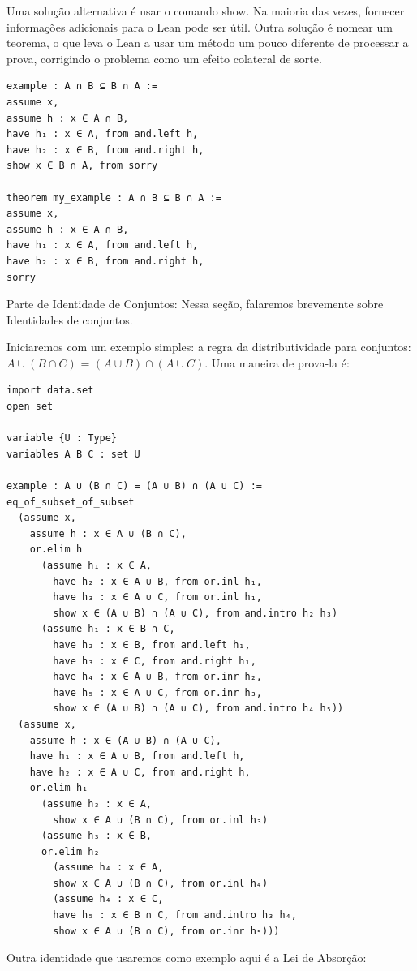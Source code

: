 Uma solução alternativa é usar o comando{
\selectfont show}. Na maioria das vezes, fornecer informações adicionais para o Lean pode ser útil. Outra solução é nomear um teorema, o que leva o Lean a usar um método um pouco diferente de processar a prova, corrigindo o problema como um efeito colateral de sorte.

\begin{lstlisting}
example : A ∩ B ⊆ B ∩ A :=
assume x,
assume h : x ∈ A ∩ B,
have h₁ : x ∈ A, from and.left h,
have h₂ : x ∈ B, from and.right h,
show x ∈ B ∩ A, from sorry

theorem my_example : A ∩ B ⊆ B ∩ A :=
assume x,
assume h : x ∈ A ∩ B,
have h₁ : x ∈ A, from and.left h,
have h₂ : x ∈ B, from and.right h,
sorry \end{lstlisting}

Parte de Identidade de Conjuntos: Nessa seção, falaremos brevemente sobre Identidades de conjuntos.

Iniciaremos com um exemplo simples: a regra da distributividade para conjuntos: $A \cup (B \cap C)$ = $(A \cup B) \cap (A \cup C)$. Uma maneira de prova-la é:


\begin{lstlisting}
import data.set
open set

variable {U : Type}
variables A B C : set U

example : A ∪ (B ∩ C) = (A ∪ B) ∩ (A ∪ C) :=
eq_of_subset_of_subset
  (assume x,
    assume h : x ∈ A ∪ (B ∩ C),
    or.elim h
      (assume h₁ : x ∈ A,
        have h₂ : x ∈ A ∪ B, from or.inl h₁,
        have h₃ : x ∈ A ∪ C, from or.inl h₁,
        show x ∈ (A ∪ B) ∩ (A ∪ C), from and.intro h₂ h₃)
      (assume h₁ : x ∈ B ∩ C,
        have h₂ : x ∈ B, from and.left h₁,
        have h₃ : x ∈ C, from and.right h₁,
        have h₄ : x ∈ A ∪ B, from or.inr h₂,
        have h₅ : x ∈ A ∪ C, from or.inr h₃,
        show x ∈ (A ∪ B) ∩ (A ∪ C), from and.intro h₄ h₅))
  (assume x,
    assume h : x ∈ (A ∪ B) ∩ (A ∪ C),
    have h₁ : x ∈ A ∪ B, from and.left h,
    have h₂ : x ∈ A ∪ C, from and.right h,
    or.elim h₁
      (assume h₃ : x ∈ A,
        show x ∈ A ∪ (B ∩ C), from or.inl h₃)
      (assume h₃ : x ∈ B,
      or.elim h₂
        (assume h₄ : x ∈ A,
        show x ∈ A ∪ (B ∩ C), from or.inl h₄)
        (assume h₄ : x ∈ C,
        have h₅ : x ∈ B ∩ C, from and.intro h₃ h₄, 
        show x ∈ A ∪ (B ∩ C), from or.inr h₅)))
\end{lstlisting}

Outra identidade que usaremos como exemplo aqui é a Lei de Absorção:  


